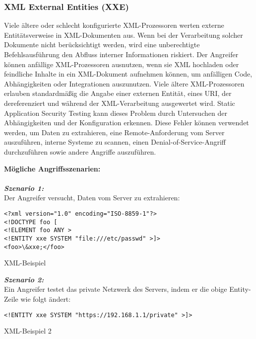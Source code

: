 \subsubsection{XML External Entities (XXE)}
Viele ältere oder schlecht konfigurierte XML-Prozessoren werten externe Entitätsverweise in XML-Dokumenten aus. Wenn bei der Verarbeitung solcher Dokumente nicht berücksichtigt werden, wird eine unberechtigte Befehlsausführung den Abfluss interner Informationen riskiert\cite[6]{owasp17top10}. Der Angreifer können anfällige XML-Prozessoren ausnutzen, wenn sie XML hochladen oder feindliche Inhalte in ein XML-Dokument aufnehmen können, um anfälligen Code, Abhängigkeiten oder Integrationen auszunutzen. Viele ältere XML-Prozessoren erlauben standardmäßig die Angabe einer externen Entität, eines URI, der dereferenziert und während der XML-Verarbeitung ausgewertet wird. Static Application Security Testing kann dieses Problem durch Untersuchen der Abhängigkeiten und der Konfiguration erkennen. Diese Fehler können verwendet werden, um Daten zu extrahieren, eine Remote-Anforderung vom Server auszuführen, interne Systeme zu scannen, einen Denial-of-Service-Angriff durchzuführen sowie andere Angriffe auszuführen\cite[10]{owasp17top10}.

\textbf{Mögliche Angriffsszenarien:}\\
\\
\textbf{\textit{Szenario 1:}}\\
Der Angreifer versucht, Daten vom Server zu extrahieren\cite[10]{owasp17top10}:

\begin{Listing}[h]
	\begin{lstlisting}
<?xml version="1.0" encoding="ISO-8859-1"?>
<!DOCTYPE foo [
<!ELEMENT foo ANY >
<!ENTITY xxe SYSTEM "file:///etc/passwd" >]>
<foo>\&xxe;</foo>
	\end{lstlisting}
	\caption{XML-Beispiel}
	\label{lst:xxe1}
\end{Listing}


\textbf{\textit{Szenario 2:}}\\
Ein Angreifer testet das private Netzwerk des Servers, indem er die obige Entity-Zeile wie folgt ändert\cite[10]{owasp17top10}:

\begin{Listing}[h]
	\begin{lstlisting}
<!ENTITY xxe SYSTEM "https://192.168.1.1/private" >]>
	\end{lstlisting}
	\caption{XML-Beispiel 2}
	\label{lst:xxe2}
\end{Listing}



